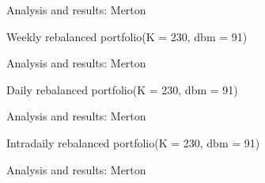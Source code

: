 \documentclass{beamer}
\begin{document}
\begin{frame}{Analysis and results: Merton}

  \begin{block}{Weekly rebalanced portfolio(K = 230, dbm = 91)}
    \begin{figure}[h]
      \centering
      
    \end{figure}
  \end{block}
 
\end{frame}


\begin{frame}{Analysis and results: Merton}

  \begin{block}{Daily rebalanced portfolio(K = 230, dbm = 91)}
    \begin{figure}[h]
      \centering
      
    \end{figure}
  \end{block}
  
\end{frame}


\begin{frame}{Analysis and results: Merton}

  \begin{block}{Intradaily rebalanced portfolio(K = 230, dbm = 91)}
    \begin{figure}[h]
      \centering
      
    \end{figure}
  \end{block}
 
\end{frame}

\begin{frame}{Analysis and results: Merton}

    \begin{figure}[h]
      \centering
      
    \end{figure}
 
\end{frame}
\end{document}
